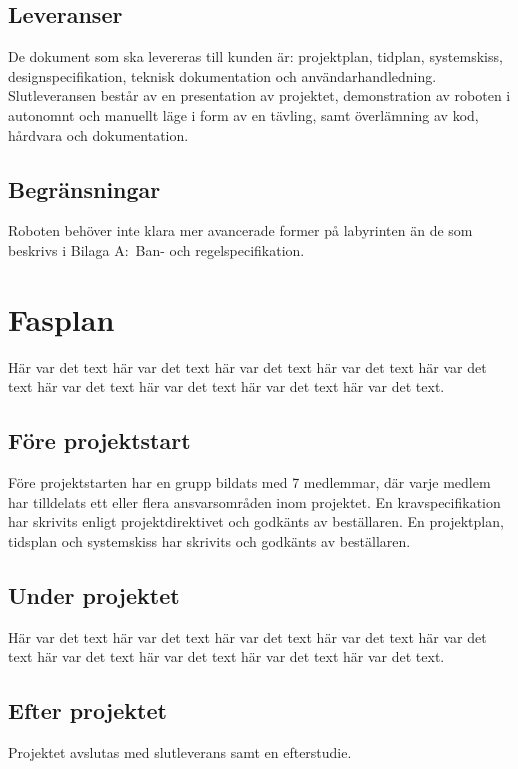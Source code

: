 \documentclass[a4paper,titlepage,12pt]{article}
\begin{document}
	
	
	\subsection{Leveranser}
	De dokument som ska levereras till kunden är: projektplan, tidplan,
    systemskiss, designspecifikation, teknisk dokumentation och
    användarhandledning. Slutleveransen består av en presentation av projektet,
    demonstration av roboten i autonomnt och manuellt läge i form av en tävling,
    samt överlämning av kod, hårdvara och dokumentation.
	
	
	\subsection{Begränsningar}
	Roboten behöver inte klara mer avancerade former på labyrinten än de som
    beskrivs i Bilaga A:\ Ban- och regelspecifikation.
	
	
	\section{Fasplan}
	Här var det text här var det text här var det text
	här var det text här var det text här var det text
	här var det text här var det text här var det text.
	
	\subsection{Före projektstart}
    Före projektstarten har en grupp bildats med 7 medlemmar, där varje medlem
    har tilldelats ett eller flera ansvarsområden inom projektet. En
    kravspecifikation har skrivits enligt projektdirektivet och godkänts av
    beställaren. En projektplan, tidsplan och systemskiss har skrivits och
    godkänts av beställaren.
	
	
	\subsection{Under projektet}
	Här var det text här var det text här var det text
	här var det text här var det text här var det text
	här var det text här var det text här var det text.
	
	
	\subsection{Efter projektet}
    Projektet avslutas med slutleverans samt en efterstudie.
	
\end{document}
